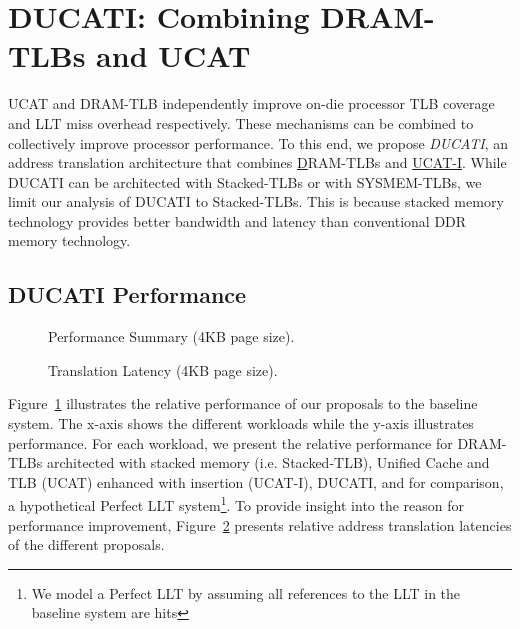 \newpage
\section{DUCATI: Combining DRAM-TLBs \newline and UCAT}
\label{sec:DUCATI}

\noindent UCAT and DRAM-TLB independently improve on-die processor TLB
coverage and LLT miss overhead respectively. These mechanisms can be
combined to collectively improve processor performance. To this end,
we propose {\em DUCATI}, an address translation architecture that
combines \underline{D}RAM-TLBs and \underline{UCAT-I}. While DUCATI
can be architected with Stacked-TLBs or with SYSMEM-TLBs, we limit our
analysis of DUCATI to Stacked-TLBs. This is because stacked memory
technology provides better bandwidth and latency than
conventional DDR memory technology.

\subsection{DUCATI Performance}

\begin{figure}[tp] 
\vspace{-0.0 in} \centering
\centerline{}

\caption{\small Performance Summary (4KB page size).\normalsize}
\label{fig:summary_4k_pages_perf} 
\vspace{0.1 in}
\end{figure}

\begin{figure}[tp] 
\vspace{0.1 in} \centering
\centerline{}

\caption{\small Translation Latency (4KB page size).\normalsize}
\label{fig:summary_4k_pages_lat} 
\vspace{-0. in}
\end{figure}

\noindent Figure~\ref{fig:summary_4k_pages_perf} illustrates the
relative performance of our proposals to the baseline system. The
x-axis shows the different workloads while the y-axis illustrates
performance. For each workload, we present the relative performance
for DRAM-TLBs architected with stacked memory (i.e. Stacked-TLB),
Unified Cache and TLB (UCAT) enhanced with insertion (UCAT-I), DUCATI,
and for comparison, a hypothetical Perfect LLT system\footnote{We
model a Perfect LLT by assuming all references to the LLT in the
baseline system are hits}. To provide insight into the reason for
performance improvement, Figure~\ref{fig:summary_4k_pages_lat}
presents relative address translation latencies of the different
proposals. 

